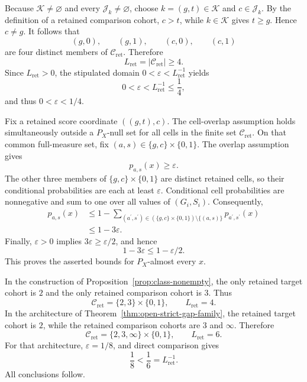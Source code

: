 Because \(\mathcal K\ne\varnothing\) and every \(\mathcal J_k\ne\varnothing\), choose \(k=(g,t)\in\mathcal K\) and \(c\in\mathcal J_k\). By the definition of a retained comparison cohort, \(c>t\), while \(k\in\mathcal K\) gives \(t\ge g\). Hence \(c\ne g\). It follows that
\[
 (g,0),\qquad (g,1),\qquad (c,0),\qquad (c,1)
\]
are four distinct members of \(\mathcal C_{\mathrm{ret}}\). Therefore
\[
 L_{\mathrm{ret}}=|\mathcal C_{\mathrm{ret}}|\ge4.
\]
Since \(L_{\mathrm{ret}}>0\), the stipulated domain \(0<\varepsilon<L_{\mathrm{ret}}^{-1}\) yields
\[
 0<\varepsilon<L_{\mathrm{ret}}^{-1}\le\frac14,
\]
and thus \(0<\varepsilon<1/4\).

Fix a retained score coordinate \(((g,t),c)\). The cell-overlap assumption holds simultaneously outside a \(P_X\)-null set for all cells in the finite set \(\mathcal C_{\mathrm{ret}}\). On that common full-measure set, fix \((a,s)\in\{g,c\}\times\{0,1\}\). The overlap assumption gives
\[
 p_{a,s}(x)\ge\varepsilon.
\]
The other three members of \(\{g,c\}\times\{0,1\}\) are distinct retained cells, so their conditional probabilities are each at least \(\varepsilon\). Conditional cell probabilities are nonnegative and sum to one over all values of \((G_i,S_i)\). Consequently,
\[
\begin{aligned}
 p_{a,s}(x)
 &\le 1-
 \sum_{(a^{\prime},s^{\prime})\in(\{g,c\}\times\{0,1\})\setminus\{(a,s)\}}
 p_{a^{\prime},s^{\prime}}(x)\\
 &\le1-3\varepsilon.
\end{aligned}
\]
Finally, \(\varepsilon>0\) implies \(3\varepsilon\ge\varepsilon/2\), and hence
\[
 1-3\varepsilon\le1-\varepsilon/2.
\]
This proves the asserted bounds for \(P_X\)-almost every \(x\).

In the construction of Proposition~\ref{prop:class-nonempty}, the only retained target cohort is \(2\) and the only retained comparison cohort is \(3\). Thus
\[
 \mathcal C_{\mathrm{ret}}=\{2,3\}\times\{0,1\},
 \qquad L_{\mathrm{ret}}=4.
\]
In the architecture of Theorem~\ref{thm:open-strict-gap-family}, the retained target cohort is \(2\), while the retained comparison cohorts are \(3\) and \(\infty\). Therefore
\[
 \mathcal C_{\mathrm{ret}}=\{2,3,\infty\}\times\{0,1\},
 \qquad L_{\mathrm{ret}}=6.
\]
For that architecture, \(\varepsilon=1/8\), and direct comparison gives
\[
 \frac18<\frac16=L_{\mathrm{ret}}^{-1}.
\]
All conclusions follow.